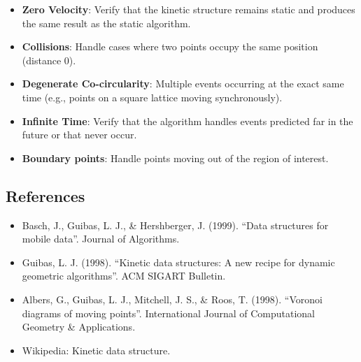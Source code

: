 \begin{itemize}
\item \textbf{Zero Velocity}: Verify that the kinetic structure remains static and produces the same result as the static algorithm.
\item \textbf{Collisions}: Handle cases where two points occupy the same position (distance 0).
\item \textbf{Degenerate Co-circularity}: Multiple events occurring at the exact same time (e.g., points on a square lattice moving synchronously).
\item \textbf{Infinite Time}: Verify that the algorithm handles events predicted far in the future or that never occur.
\item \textbf{Boundary points}: Handle points moving out of the region of interest.
\end{itemize}

\subsection{References}

\begin{itemize}
\item Basch, J., Guibas, L. J., \& Hershberger, J. (1999). ``Data structures for mobile data''. Journal of Algorithms.
\item Guibas, L. J. (1998). ``Kinetic data structures: A new recipe for dynamic geometric algorithms''. ACM SIGART Bulletin.
\item Albers, G., Guibas, L. J., Mitchell, J. S., \& Roos, T. (1998). ``Voronoi diagrams of moving points''. International Journal of Computational Geometry \& Applications.
\item Wikipedia: Kinetic data structure.
\end{itemize}
